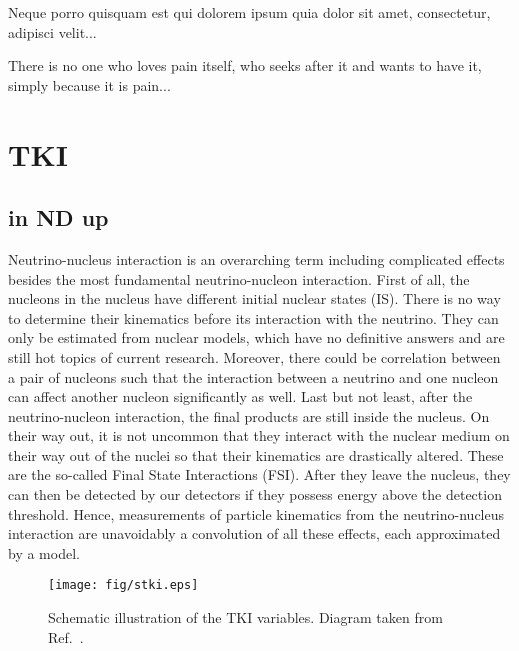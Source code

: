 \begin{savequote}[8cm]
\textlatin{Neque porro quisquam est qui dolorem ipsum quia dolor sit amet, consectetur, adipisci velit...}

There is no one who loves pain itself, who seeks after it and wants to have it, simply because it is pain...
\end{savequote}

\chapter{\label{ch:5-tki}TKI} 

\minitoc

\section{in ND up}


       Neutrino-nucleus interaction is an overarching term including complicated effects besides the most fundamental neutrino-nucleon interaction. 
       First of all, the nucleons in the nucleus have different initial nuclear states (IS). 
       There is no way to determine their kinematics before its interaction with the neutrino. 
       They can only be estimated from nuclear models, which have no definitive answers and are still hot topics of current research. 
       Moreover, there could be correlation between a pair of nucleons such that the interaction between a neutrino and one nucleon can affect another nucleon significantly as well. Last but not least, after the neutrino-nucleon interaction, the final products are still inside the nucleus. 
       On their way out, it is not uncommon that they interact with the nuclear medium on their way out of the nuclei so that their kinematics are drastically altered. 
       These are the so-called Final State Interactions (FSI). 
       After they leave the nucleus, they can then be detected by our detectors if they possess energy above the detection threshold. 
       Hence, measurements of particle kinematics from the neutrino-nucleus interaction are unavoidably a convolution of all these effects, each approximated by a model. 
    
        \begin{figure}[!htb] 	
            \centering 		
            \texttt{[image: fig/stki.eps]}
            \caption{\label{fig:stki} Schematic illustration of the TKI variables. Diagram taken from Ref.~\cite{Lu:2015tcr}.} 
        \end{figure}
    
